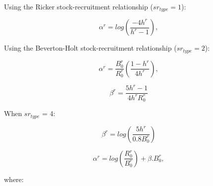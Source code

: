 \documentclass{article}
\begin{document}
Using the Ricker stock-recruitment relationship ($sr_{type} = 1$):

\begin{equation}
\alpha^r = log\left(\dfrac{-4h^{r}}{h^{r}-1}\right),
\end{equation}

Using the Beverton-Holt stock-recruitment relationship ($sr_{type} = 2$):

\begin{equation}
\alpha^r = \dfrac{B^{r}_0}{R^{r}_0}\left(\dfrac{1 - h^{r}}{4h^{r}}\right),  
\end{equation}

\begin{equation}
\beta^r = \dfrac{5h^{r}-1}{4h^{r}R^{r}_0}
\end{equation}

When $sr_{type}$ = 4:

\begin{equation}
\beta^r = log\left(\dfrac{5h^{r}} {0.8 B^{r}_0}\right)
\end{equation}

\begin{equation}
\alpha^r = log\left(\dfrac{R^{r}_0} {B^{r}_0}\right) + \beta .B^{r}_0, 
\end{equation}


where:
\end{document}
